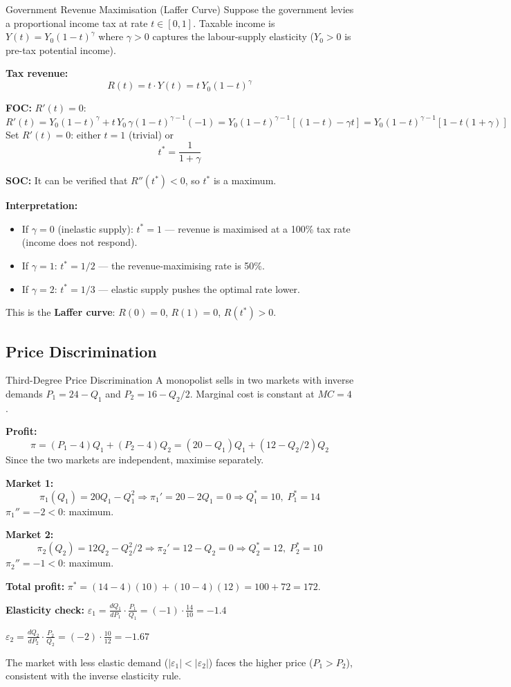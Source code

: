 \documentclass[12pt, a4paper]{article}
\theoremstyle{definition}
\begin{document}
\begin{exbox}{Government Revenue Maximisation (Laffer Curve)}
Suppose the government levies a proportional income tax at rate $t \in [0,1]$.
Taxable income is $Y(t) = Y_0(1-t)^\gamma$ where $\gamma > 0$ captures the
labour-supply elasticity ($Y_0 > 0$ is pre-tax potential income).

\textbf{Tax revenue:}
\[
  R(t) = t \cdot Y(t) = t\,Y_0(1-t)^\gamma
\]

\textbf{FOC:} $R'(t) = 0$:
\[
  R'(t) = Y_0(1-t)^\gamma + t\,Y_0\,\gamma(1-t)^{\gamma-1}(-1)
         = Y_0(1-t)^{\gamma-1}[(1-t) - \gamma t]
         = Y_0(1-t)^{\gamma-1}[1-t(1+\gamma)]
\]
Set $R'(t)=0$: either $t=1$ (trivial) or
\[
  \boxed{t^* = \frac{1}{1+\gamma}}
\]

\textbf{SOC:} It can be verified that $R''(t^*)<0$, so $t^*$ is a maximum.

\textbf{Interpretation:}
\begin{itemize}
  \item If $\gamma=0$ (inelastic supply): $t^*=1$ --- revenue is maximised
        at a 100\% tax rate (income does not respond).
  \item If $\gamma=1$: $t^*=1/2$ --- the revenue-maximising rate is 50\%.
  \item If $\gamma=2$: $t^*=1/3$ --- elastic supply pushes the optimal rate
        lower.
\end{itemize}
This is the \textbf{Laffer curve}: $R(0)=0$, $R(1)=0$, $R(t^*)>0$.
\end{exbox}

\subsection{Price Discrimination}

\begin{exbox}{Third-Degree Price Discrimination}
A monopolist sells in two markets with inverse demands $P_1 = 24-Q_1$ and
$P_2 = 16 - Q_2/2$.  Marginal cost is constant at $MC = 4$.

\textbf{Profit:}
\[
  \pi = (P_1-4)Q_1 + (P_2-4)Q_2
      = (20-Q_1)Q_1 + (12-Q_2/2)Q_2
\]
Since the two markets are independent, maximise separately.

\textbf{Market 1:}
\[
  \pi_1(Q_1) = 20Q_1 - Q_1^2
  \Rightarrow \pi_1' = 20-2Q_1 = 0
  \Rightarrow Q_1^* = 10, \; P_1^* = 14
\]
$\pi_1'' = -2 < 0$: maximum. \checkmark

\textbf{Market 2:}
\[
  \pi_2(Q_2) = 12Q_2 - Q_2^2/2
  \Rightarrow \pi_2' = 12-Q_2 = 0
  \Rightarrow Q_2^* = 12, \; P_2^* = 10
\]
$\pi_2'' = -1 < 0$: maximum. \checkmark

\textbf{Total profit:}
$\pi^* = (14-4)(10)+(10-4)(12) = 100+72 = 172$.

\textbf{Elasticity check:}
$\varepsilon_1 = \frac{dQ_1}{dP_1}\cdot\frac{P_1}{Q_1} = (-1)\cdot\frac{14}{10} = -1.4$

$\varepsilon_2 = \frac{dQ_2}{dP_2}\cdot\frac{P_2}{Q_2} = (-2)\cdot\frac{10}{12} = -1.67$

The market with less elastic demand ($|\varepsilon_1|<|\varepsilon_2|$) faces the higher price ($P_1>P_2$), consistent with the inverse elasticity rule.
\end{exbox}
\end{document}
